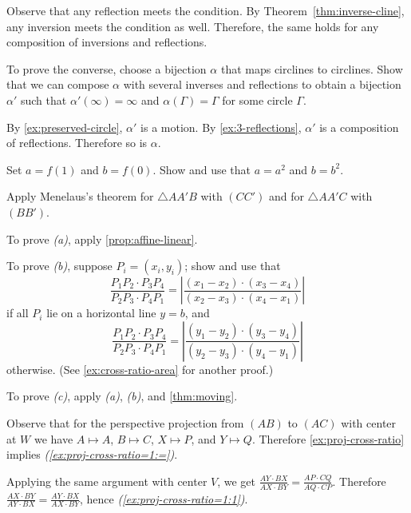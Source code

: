 Observe that any reflection meets the condition.
By Theorem~\ref{thm:inverse-cline}, any inversion meets the condition as well.
Therefore, the same holds for any composition of inversions and reflections.

To prove the converse, choose a bijection $\alpha$ that maps circlines to circlines.
Show that we can compose $\alpha$ with several inverses and reflections to obtain a bijection $\alpha'$ such that $\alpha'(\infty)=\infty$ and $\alpha(\Gamma)=\Gamma$ for some circle $\Gamma$.

By \ref{ex:preserved-circle}, $\alpha'$ is a motion.
By \ref{ex:3-reflections}, $\alpha'$ is a composition of reflections.
Therefore so is $\alpha$.

Set $a=f(1)$ and $b=f(0)$.
Show and use that $a=a^2$ and $b=b^2$.

 Apply Menelaus's theorem
for $\triangle AA'B$ with $(CC')$
and
for $\triangle AA'C$ with $(BB')$.

\setcounter{eqtn}{0}

To prove \textit{(a)}, apply \ref{prop:affine-linear}.

To prove \textit{(b)}, suppose $P_i=(x_i,y_i)$;
show and use that 
\[\frac{P_1P_2\cdot P_3P_4}{P_2P_3\cdot P_4P_1}
=\left|\frac{(x_1-x_2)\cdot(x_3-x_4)}{(x_2-x_3)\cdot (x_4-x_1)}\right|\]
if all $P_i$ lie on a horizontal line $y=b$, and
\[\frac{P_1P_2\cdot P_3P_4}{P_2P_3\cdot P_4P_1}
=\left|\frac{(y_1-y_2)\cdot(y_3-y_4)}{(y_2-y_3)\cdot (y_4-y_1)}\right|\]
otherwise. (See \ref{ex:cross-ratio-area} for another proof.)

To prove \textit{(c)}, apply \textit{(a)}, \textit{(b)}, and \ref{thm:moving}.

Observe that for the perspective projection from $(AB)$ to $(AC)$ with center at $W$ we have
$A\mapsto A$, $B\mapsto C$, $X\mapsto P$, and $Y\mapsto Q$.
Therefore \ref{ex:proj-cross-ratio} implies \textit{(\ref{ex:proj-cross-ratio=1:=})}.

Applying the same argument with center $V$, we get  
$\frac{AY\cdot BX}{AX\cdot BY}=\frac{AP\cdot CQ}{AQ\cdot CP}$.
Therefore 
$\frac{AX\cdot BY}{AY\cdot BX}=\frac{AY\cdot BX}{AX\cdot BY}$,
hence \textit{(\ref{ex:proj-cross-ratio=1:1})}.


